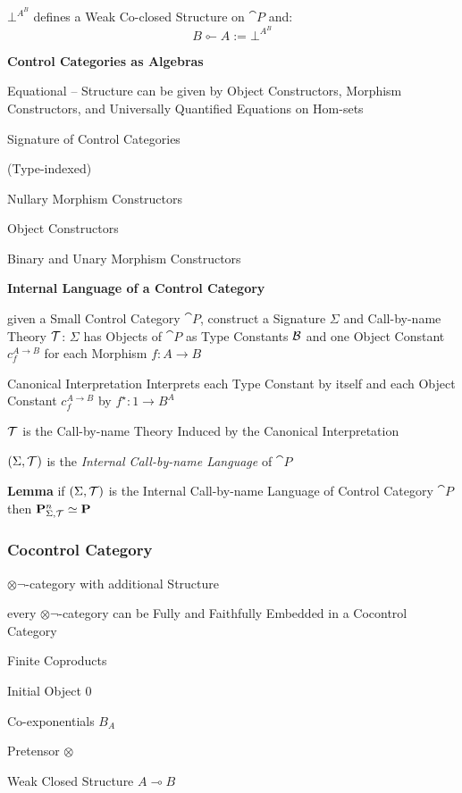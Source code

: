 $\bot^{A^B}$ defines a Weak Co-closed Structure on $\cat{P}$ and:
\[
  B \multimapinv A := \bot^{A^B}
\]


\textbf{Control Categories as Algebras}

Equational -- Structure can be given by Object Constructors, Morphism
Constructors, and Universally Quantified Equations on Hom-sets

Signature of Control Categories

(Type-indexed)

Nullary Morphism Constructors

Object Constructors

Binary and Unary Morphism Constructors



\textbf{Internal Language of a Control Category}

given a Small Control Category $\cat{P}$, construct a Signature
$\Sigma$ and Call-by-name Theory $\mathcal{T}$: $\Sigma$ has Objects of
$\cat{P}$ as Type Constants $\mathcal{B}$ and one Object Constant
$c_f^{A \rightarrow B}$ for each Morphism $f : A \rightarrow B$

Canonical Interpretation Interprets each Type Constant by
itself and each Object Constant $c_f^{A \rightarrow B}$ by $f^\star :
1 \rightarrow B^A$

$\mathcal{T}$ is the Call-by-name Theory Induced by the Canonical
Interpretation

$(\Sigma,\mathcal{T})$ is the \emph{Internal Call-by-name Language} of
$\cat{P}$

\textbf{Lemma} if $(\Sigma,\mathcal{T})$ is the Internal Call-by-name
Language of Control Category $\cat{P}$ then
$\mathbf{P}^n_{\Sigma,\mathcal{T}} \simeq \mathbf{P}$



\subsubsection{Cocontrol Category}\label{sec:cocontrol_category}

$\otimes\neg$-category with additional Structure %

every $\otimes\neg$-category can be Fully and Faithfully Embedded in a
Cocontrol Category

Finite Coproducts

Initial Object $0$

Co-exponentials $B_A$

Pretensor $\otimes$

Weak Closed Structure $A \multimap B$

